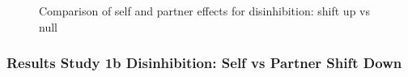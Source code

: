 \documentclass[
  singlecolumn]{article}
\begin{document}
\begin{figure}


\caption{\label{fig-results-disinhibition-self-partner-up-comparison}Comparison
of self and partner effects for disinhibition: shift up vs null}

\end{figure}%

\newpage{}

\subsubsection{Results Study 1b Disinhibition: Self vs Partner Shift
Down}\label{results-study-1b-disinhibition-self-vs-partner-shift-down}
\end{document}
